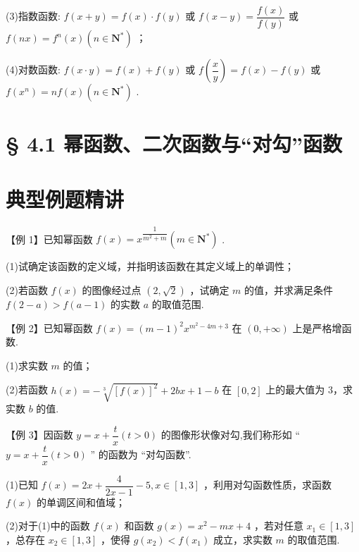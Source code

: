 (3)指数函数: $f\left( {x + y}\right)  = f\left( x\right)  \cdot  f\left( y\right)$ 或 $f\left( {x - y}\right)  = \dfrac{f\left( x\right) }{f\left( y\right) }$ 或 $f\left( {nx}\right)  = {f}^{n}\left( x\right) \left( {n \in  {\mathbf{N}}^{ * }}\right)$ ；

(4)对数函数: $f\left( {x \cdot  y}\right)  = f\left( x\right)  + f\left( y\right)$ 或 $f\left( \dfrac{x}{y}\right)  = f\left( x\right)  - f\left( y\right)$ 或 $f\left( {x}^{n}\right)  = {nf}\left( x\right) \left( {n \in  {\mathbf{N}}^{ * }}\right)$ .

\section*{§ 4.1 幂函数、二次函数与“对勾”函数}

\section*{典型例题精讲}

【例 1】已知幂函数 $f\left( x\right)  = {x}^{\dfrac{1}{{m}^{2} + m}}\left( {m \in  {\mathbf{N}}^{ * }}\right)$ .

(1)试确定该函数的定义域，并指明该函数在其定义域上的单调性；

(2)若函数 $f\left( x\right)$ 的图像经过点 $\left( {2,\sqrt{2}}\right)$ ，试确定 $m$ 的值，并求满足条件 $f\left( {2 - a}\right)  > f\left( {a - 1}\right)$ 的实数 $a$ 的取值范围.

【例 2】已知幂函数 $f\left( x\right)  = {\left( m - 1\right) }^{2}{x}^{m{}^{2} - {4m} + 3}$ 在 $\left( {0, + \infty }\right)$ 上是严格增函数.

(1)求实数 $m$ 的值；

(2)若函数 $h\left( x\right)  =  - \sqrt[3]{{\left\lbrack  f\left( x\right) \right\rbrack  }^{2}} + {2bx} + 1 - b$ 在 $\left\lbrack  {0,2}\right\rbrack$ 上的最大值为 3，求实数 $b$ 的值.

【例 3】因函数 $y = x + \dfrac{t}{x}\left( {t > 0}\right)$ 的图像形状像对勾,我们称形如 “ $y = x + \dfrac{t}{x}\left( {t > 0}\right)$ ” 的函数为 “对勾函数”.

(1)已知 $f\left( x\right)  = {2x} + \dfrac{4}{{2x} - 1} - 5,x \in  \left\lbrack  {1,3}\right\rbrack$ ，利用对勾函数性质，求函数 $f\left( x\right)$ 的单调区间和值域；

(2)对于(1)中的函数 $f\left( x\right)$ 和函数 $g\left( x\right)  = {x}^{2} - {mx} + 4$ ，若对任意 ${x}_{1} \in  \left\lbrack  {1,3}\right\rbrack$ ，总存在 ${x}_{2} \in  \left\lbrack  {1,3}\right\rbrack$ ，使得 $g\left( {x}_{2}\right)  < f\left( {x}_{1}\right)$ 成立，求实数 $m$ 的取值范围.

